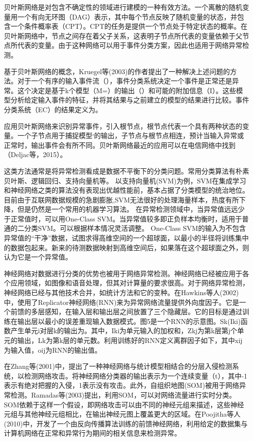 贝叶斯网络是对包含不确定性的领域进行建模的一种有效方法。一个离散的随机变量用一个有向无环图（DAG）表示，其中每个节点反映了随机变量的状态，并包含一个条件概率表（CPT）。CPT的任务是提供一个节点处于特定状态的概率。在贝叶斯网络中，节点之间存在着父子关系，这表明子节点所代表的变量依赖于父节点所代表的变量。由于这种网络可以用于事件分类方案，因此也适用于网络异常检测。

基于贝叶斯网络的概念，Kruegel等(2003)的作者提出了一种解决上述问题的方法。对于一个有序的输入事件流（），事件分类系统决定一个事件是正常还是异常。这个决定是基于k个模型（M=）的输出（）和可能的附加信息（I）。这些模型分析给定输入事件的特征，并将其结果与之前建立的模型的结果进行比较。事件分类系统（EC）的结果定义为。

应用贝叶斯网络来识别异常事件，引入根节点，根节点代表一个具有两种状态的变量。一个子节点用于捕捉模型׳的输出，子节点与根节点相连，预计当输入异常或正常时，输出事件会有所不同。贝叶斯网络最近的应用可以在电信网络中找到（Deljac等，2015）。

这类方法通常是将异常检测看成是数据不平衡下的分类问题。常用分类算法有朴素贝叶斯、逻辑回归、支持向量机等。
以支持向量机(SVM)为例，SVM在集成学习和神经网络之类的算法没有表现出优越性能前，基本占据了分类模型的统治地位。
目前由于互联网数据规模的急剧膨胀,SVM无法很好的处理海量样本，热度有所下降，但是仍然是一个常用的机器学习算法。
在异常检测领域中，当异常值远远少于正常值时，可以用One-Class SVM。当异常值较多即正负样本均衡时，适用于普通的二分类SVM。可以根据样本情况灵活调整。
One-Class SVM的输入为不包含异常值的“干净”数据，试图求得高维空间的一个超球面，以最小的半径将训练集中的数据包起来。新来的待测数据映射到高维空间后，如果落在这个超球面之外，则认为它是一个异常值。

神经网络对数据进行分类的优势也被用于网络异常检测。神经网络已经被应用于各个应用领域，如图像和语音处理，但其对计算量的要求很高。对于网络异常检测，神经网络已经与其他技术合并，如统计方法和它的变种。在Hawkins等人(2002)中，使用了Replicator神经网络(RNN)来为异常网络流量提供外向度因子。它是一个前馈的多层感知，在输入层和输出层之间放置了三个隐藏层。它的目标是通过训练在输出层以最小的误差重现输入数据模式。图5是一个RNN的示意图。Sk(Iki)函数产生单元i对层k的输出为。其中，Iki为单元输入的加权和，Zkj为第k层第j个单元的输出，Lk为第k层的单元数。利用训练好的RNN定义离群因子如下，其中xij为输入值，oij为RNN的输出值。

在Zhang等(2001)中，提出了一种神经网络与统计模型相结合的分层入侵检测系统，以检测网络攻击。将神经网络分类器的输出表示为一个连续变量（t），其中-1表示有绝对把握的入侵，1表示没有攻击。此外，自组织地图(SOM)被用于网络异常检测。Ramadas等(2003)提出，利用SOM，可以对网络流量进行实时分类。SOM依赖于这样一个假设，即网络攻击可以由不同的神经元组来描述，这些神经元组与其他神经元组相比，在输出神经元图上覆盖更大的区域。在Poojitha等人(2010)中，开发了一个由反向传播算法训练的前馈神经网络，利用给定的数据集与计算机网络在正常和异常行为期间的相关信息来检测异常。


